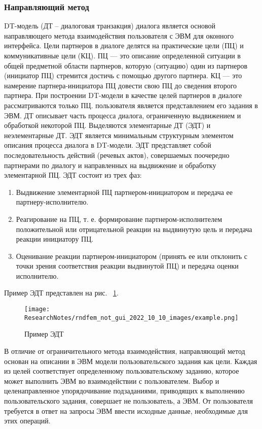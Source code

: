 \subsubsection{Направляющий метод}
	DT-модель (ДТ – диалоговая транзакция) диалога является основой направляющего метода взаимодействия пользователя с ЭВМ для оконного интерфейса. 
	Цели партнеров в диалоге делятся на практические цели (ПЦ) и коммуникативные цели (КЦ). ПЦ — это описание определенной ситуации в общей предметной области партнеров, которую (ситуацию) один из партнеров (инициатор ПЦ) стремится достичь с помощью другого партнера. КЦ — это намерение партнера-инициатора ПЦ довести свою ПЦ до сведения второго партнера. При построении DT-модели в качестве целей партнеров в диалоге рассматриваются только ПЦ. пользователя является представлением его задания в ЭВМ. ДТ описывает часть процесса диалога, ограниченную выдвижением и обработкой некоторой ПЦ. Выделяются элементарные ДТ (ЭДТ) и неэлементарные ДТ. ЭДТ является минимальным структурным элементом описания процесса диалога в DT-модели. ЭДТ представляет собой последовательность действий (речевых актов), совершаемых поочередно партнерами по диалогу и направленных на выдвижение и обработку элементарной ПЦ. ЭДТ состоит из трех фаз:
\begin{enumerate}
	\item Выдвижение элементарной ПЦ партнером-инициатором и передача ее партнеру-исполнителю.
	\item Реагирование на ПЦ, т. е. формирование партнером-исполнителем положительной или отрицательной реакции на выдвинутую цель и передача реакции инициатору ПЦ.
	\item Оценивание реакции партнером-инициатором (принять ее или отклонить с точки зрения соответствия реакции выдвинутой ПЦ) и передача оценки исполнителю.
\end{enumerate}

	Пример ЭДТ представлен на рис. ~\ref{example}.
\begin{figure}[!ht]
  \centering
  \texttt{[image: ResearchNotes/rndfem\_not\_gui\_2022\_10\_10\_images/example.png]}
  \caption{Пример ЭДТ}
  \label{example}
\end{figure}

	В отличие от ограничительного метода взаимодействия, направляющий метод основан на описании в ЭВМ модели пользовательского задания как цели. Каждая из целей соответствует определенному пользовательскому заданию, которое может выполнить ЭВМ во взаимодействии с пользователем. Выбор и целенаправленное упорядочивание подзаданиями, приводящих к выполнению пользовательского задания, совершает не пользователь, а ЭВМ. От пользователя требуется в ответ на запросы ЭВМ ввести исходные данные, необходимые для этих операций.

